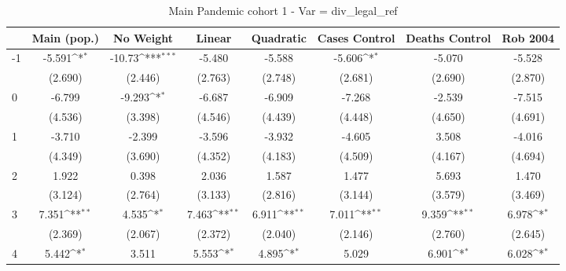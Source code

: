 \documentclass{article}
\begin{document}
{
\def\sym#1{\ifmmode^{#1}\else\(^{#1}\)\fi}
\begin{longtable}{l*{7}{c}}
\caption{Main Pandemic cohort 1 - Var = div\_legal\_ref}\\
\hline\hline\endfirsthead\hline\endhead\hline\endfoot\endlastfoot
                &\multicolumn{1}{c}{Main (pop.)}&\multicolumn{1}{c}{No Weight}&\multicolumn{1}{c}{Linear}&\multicolumn{1}{c}{Quadratic}&\multicolumn{1}{c}{Cases Control}&\multicolumn{1}{c}{Deaths Control}&\multicolumn{1}{c}{Rob 2004}\\
\hline
-1              &   -5.591\sym{*}  &   -10.73\sym{***}&   -5.480         &   -5.588         &   -5.606\sym{*}  &   -5.070         &   -5.528         \\
                &  (2.690)         &  (2.446)         &  (2.763)         &  (2.748)         &  (2.681)         &  (2.690)         &  (2.870)         \\
0               &   -6.799         &   -9.293\sym{*}  &   -6.687         &   -6.909         &   -7.268         &   -2.539         &   -7.515         \\
                &  (4.536)         &  (3.398)         &  (4.546)         &  (4.439)         &  (4.448)         &  (4.650)         &  (4.691)         \\
1               &   -3.710         &   -2.399         &   -3.596         &   -3.932         &   -4.605         &    3.508         &   -4.016         \\
                &  (4.349)         &  (3.690)         &  (4.352)         &  (4.183)         &  (4.509)         &  (4.167)         &  (4.694)         \\
2               &    1.922         &    0.398         &    2.036         &    1.587         &    1.477         &    5.693         &    1.470         \\
                &  (3.124)         &  (2.764)         &  (3.133)         &  (2.816)         &  (3.144)         &  (3.579)         &  (3.469)         \\
3               &    7.351\sym{**} &    4.535\sym{*}  &    7.463\sym{**} &    6.911\sym{**} &    7.011\sym{**} &    9.359\sym{**} &    6.978\sym{*}  \\
                &  (2.369)         &  (2.067)         &  (2.372)         &  (2.040)         &  (2.146)         &  (2.760)         &  (2.645)         \\
4               &    5.442\sym{*}  &    3.511         &    5.553\sym{*}  &    4.895\sym{*}  &    5.029         &    6.901\sym{*}  &    6.028\sym{*}  \\

\end{longtable}}
\end{document}
